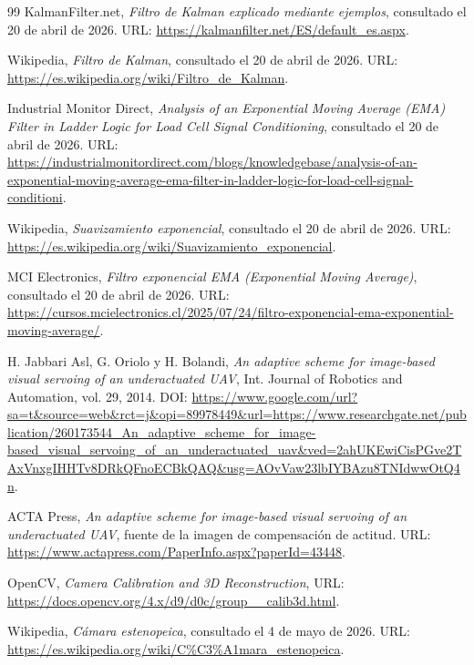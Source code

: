 \begin{thebibliography}{99}
 KalmanFilter.net, \textit{Filtro de Kalman explicado mediante ejemplos}, consultado el 20 de abril de 2026. URL: \url{https://kalmanfilter.net/ES/default_es.aspx}.

 Wikipedia, \textit{Filtro de Kalman}, consultado el 20 de abril de 2026. URL: \url{https://es.wikipedia.org/wiki/Filtro_de_Kalman}.

 Industrial Monitor Direct, \textit{Analysis of an Exponential Moving Average (EMA) Filter in Ladder Logic for Load Cell Signal Conditioning}, consultado el 20 de abril de 2026. URL: \url{https://industrialmonitordirect.com/blogs/knowledgebase/analysis-of-an-exponential-moving-average-ema-filter-in-ladder-logic-for-load-cell-signal-conditioni}.

 Wikipedia, \textit{Suavizamiento exponencial}, consultado el 20 de abril de 2026. URL: \url{https://es.wikipedia.org/wiki/Suavizamiento_exponencial}.

 MCI Electronics, \textit{Filtro exponencial EMA (Exponential Moving Average)}, consultado el 20 de abril de 2026. URL: \url{https://cursos.mcielectronics.cl/2025/07/24/filtro-exponencial-ema-exponential-moving-average/}.

 H. Jabbari Asl, G. Oriolo y H. Bolandi, \textit{An adaptive scheme for image-based visual servoing of an underactuated UAV}, Int. Journal of Robotics and Automation, vol. 29, 2014. DOI: \url{https://www.google.com/url?sa=t&source=web&rct=j&opi=89978449&url=https://www.researchgate.net/publication/260173544_An_adaptive_scheme_for_image-based_visual_servoing_of_an_underactuated_uav&ved=2ahUKEwiCisPGve2TAxVnxgIHHTv8DRkQFnoECBkQAQ&usg=AOvVaw23lbIYBAzu8TNIdwwOtQ4n}.

 ACTA Press, \textit{An adaptive scheme for image-based visual servoing of an underactuated UAV}, fuente de la imagen de compensación de actitud. URL: \url{https://www.actapress.com/PaperInfo.aspx?paperId=43448}.

 OpenCV, \textit{Camera Calibration and 3D Reconstruction}, URL: \url{https://docs.opencv.org/4.x/d9/d0c/group__calib3d.html}.

 Wikipedia, \textit{Cámara estenopeica}, consultado el 4 de mayo de 2026. URL: \url{https://es.wikipedia.org/wiki/C%C3%A1mara_estenopeica}.


\end{thebibliography}
